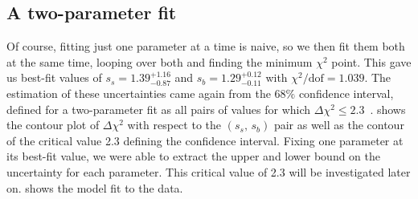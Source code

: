 \documentclass[11pt]{article}
\newcommand{\chisq}{\chi^2}
\newcommand{\chisqdof}{\chi^2/\mathrm{dof}}
\numberwithin{equation}{section}
\numberwithin{figure}{section}
\numberwithin{table}{section}
\begin{document}
\subsection{A two-parameter fit}\label{sec:twoParamFit}
Of course, fitting just one parameter at a time is naive, so we then fit them both at the same time, looping over both and finding the minimum $\chisq$ point. This gave us best-fit values of $s_s=1.39^{+1.16}_{-0.87}$ and $s_b=1.29^{+0.12}_{-0.11}$ with $\chisqdof=1.039$. The estimation of these uncertainties came again from the $68\%$ confidence interval, defined for a two-parameter fit as all pairs of values for which $\Delta\chisq\leq2.3$~\cite{XRay_energy_spectra}.  shows the contour plot of $\Delta\chisq$ with respect to the $(s_s,\,s_b)$ pair as well as the contour of the critical value 2.3 defining the confidence interval. Fixing one parameter at its best-fit value, we were able to extract the upper and lower bound on the uncertainty for each parameter. This critical value of 2.3 will be investigated later on.  shows the model fit to the data.
\end{document}
